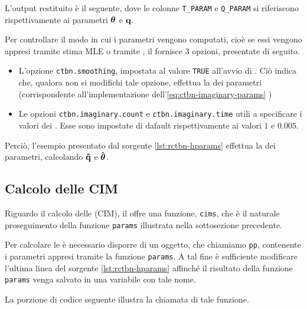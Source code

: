 L'output restituito è il seguente, dove le colonne \lstinline$T_PARAM$ e \lstinline$Q_PARAM$ si riferiscono rispettivamente ai parametri $\boldsymbol{\textbf{\text{$\theta$}}}$ e $\boldsymbol{\textbf{\text{q}}}$.

\vspace*{8pt}\vspace*{8pt}

Per controllare il modo in cui i parametri vengono computati, cioè se essi vengono appresi tramite stima \acl{MLE} o tramite , il \pacchettor{} fornisce $3$ opzioni, presentate di seguito.
\begin{itemize}
	\item L'opzione \lstinline$ctbn.smoothing$, impostata al valore \lstinline[language=rstats]{TRUE} all'avvio di \rctbn{}. Ciò indica che, qualora non si modifichi tale opzione, \rctbn{} effettua la \emph{} dei parametri (corrispondente all'implementazione dell'\autoref{eq:ctbn-imaginary-params} )
	\item Le opzioni \lstinline$ctbn.imaginary.count$  e \lstinline$ctbn.imaginary.time$ utili a specificare i valori dei \emph{}. Esse sono impostate di dafault rispettivamente ai valori $1$ e $0.005$.
\end{itemize}
Perciò, l'esempio presentato dal sorgente \ref{lst:rctbn-hparams} effettua la \emph{} dei parametri, calcolando $\boldsymbol{\hat{\textbf{q}}}$ e $\greekhat{\theta}$.

\subsection{Calcolo delle CIM}
Riguardo il calcolo delle \im{} \cond{} (\acs{CIM}), il \pacchettor{} offre una funzione, \lstinline[language=rstats]{cims}, che è il naturale proseguimento della funzione \lstinline[language=rstats]{params} illustrata nella sottosezione precedente.

Per calcolare le \im{} \cond{} è necessario disporre di un oggetto, che chiamiamo \lstinline$pp$, contenente i parametri appresi tramite la funzione \lstinline[language=rstats]{params}. A tal fine è sufficiente modificare l'ultima linea del sorgente \ref{lst:rctbn-hparams} affinché il risultato della funzione \lstinline[language=rstats]{params} venga salvato in una variabile con tale nome.

La porzione di codice seguente illustra la chiamata di tale funzione.


